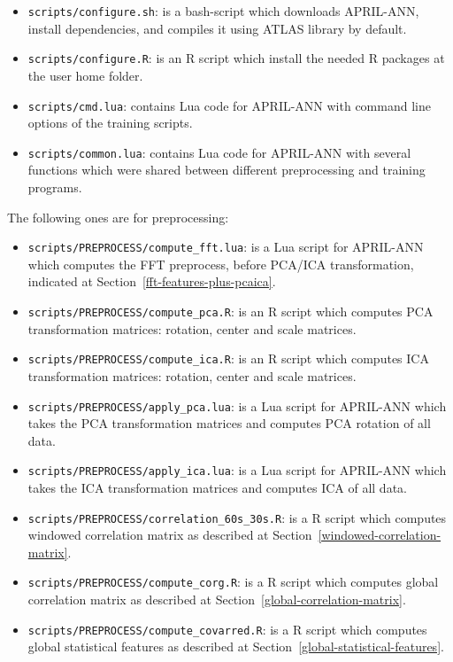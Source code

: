 \documentclass[a4paper,english,twoside]{article}
\begin{document}
\begin{itemize}
\item \verb+scripts/configure.sh+: is a bash-script which downloads APRIL-ANN,
  install dependencies, and compiles it using ATLAS library by default.
\item \verb+scripts/configure.R+: is an R script which install the needed
  R packages at the user home folder.
\item \verb+scripts/cmd.lua+: contains Lua code for APRIL-ANN with command
  line options of the training scripts.
\item \verb+scripts/common.lua+: contains Lua code for APRIL-ANN with several
  functions which were shared between different preprocessing and training
  programs.
\end{itemize}

The following ones are for preprocessing:

\begin{itemize}
\item \verb+scripts/PREPROCESS/compute_fft.lua+: is a Lua script for APRIL-ANN
  which computes the FFT preprocess, before PCA/ICA transformation, indicated at
  Section~\ref{fft-features-plus-pcaica}.
\item \verb+scripts/PREPROCESS/compute_pca.R+: is an R script which computes
  PCA transformation matrices: rotation, center and scale matrices.
\item \verb+scripts/PREPROCESS/compute_ica.R+: is an R script which computes ICA
  transformation matrices: rotation, center and scale matrices.
\item \verb+scripts/PREPROCESS/apply_pca.lua+: is a Lua script for APRIL-ANN
  which takes the PCA transformation matrices and computes PCA rotation of all
  data.
\item \verb+scripts/PREPROCESS/apply_ica.lua+: is a Lua script for APRIL-ANN
  which takes the ICA transformation matrices and computes ICA of all data.
\item \verb+scripts/PREPROCESS/correlation_60s_30s.R+: is a R script which
  computes windowed correlation matrix as described at
  Section~\ref{windowed-correlation-matrix}.
\item \verb+scripts/PREPROCESS/compute_corg.R+: is a R script which computes
  global correlation matrix as described at
  Section~\ref{global-correlation-matrix}.
\item \verb+scripts/PREPROCESS/compute_covarred.R+: is a R script which computes
  global statistical features as described at
  Section~\ref{global-statistical-features}.
\end{itemize}
\end{document}

